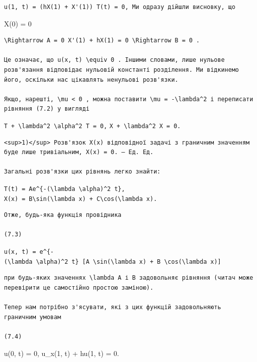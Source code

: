 \documentclass[
  ukrainian,
]{article}
\begin{document}
\begin{verbatim}
u(1, t) = (hX(1) + X'(1)) T(t) = 0, Ми одразу дійшли висновку, що
\end{verbatim}

X(0) = 0

\begin{verbatim}
\Rightarrow A = 0 X'(1) + hX(1) = 0 \Rightarrow B = 0 .

Це означає, що u(x, t) \equiv 0 . Іншими словами, лише нульове розв'язання відповідає нульовій константі розділення. Ми відкинемо його, оскільки нас цікавлять ненульові розв'язки.

Якщо, нарешті, \mu < 0 , можна поставити \mu = -\lambda^2 і переписати рівняння (7.2) у вигляді
\end{verbatim}

\texttt{T\textquotesingle{}\ +\ \textbackslash{}lambda\^{}2\ \textbackslash{}alpha\^{}2\ T\ =\ 0,}
\texttt{X\textquotesingle{}\ +\ \textbackslash{}lambda\^{}2\ X\ =\ 0.}

\begin{verbatim}
<sup>1)</sup> Розв'язок X(x) відповідної задачі з граничним значенням буде лише тривіальним, X(x) = 0. — Ед. Ед.

Загальні розв'язки цих рівнянь легко знайти:
\end{verbatim}

\texttt{T(t)\ =\ Ae\^{}\{-(\textbackslash{}lambda\ \textbackslash{}alpha)\^{}2\ t\},}
\texttt{X(x)\ =\ B\textbackslash{}sin(\textbackslash{}lambda\ x)\ +\ C\textbackslash{}cos(\textbackslash{}lambda\ x).}

\begin{verbatim}
Отже, будь-яка функція провідника

(7.3)
\end{verbatim}

\texttt{u(x,\ t)\ =\ e\^{}\{-(\textbackslash{}lambda\ \textbackslash{}alpha)\^{}2\ t\}\ {[}A\ \textbackslash{}sin(\textbackslash{}lambda\ x)\ +\ B\ \textbackslash{}cos(\textbackslash{}lambda\ x){]}}

\begin{verbatim}
при будь-яких значеннях \lambda A і B задовольняє рівняння (читач може перевірити це самостійно простою заміною).

Тепер нам потрібно з'ясувати, які з цих функцій задовольняють граничним умовам

(7.4)
\end{verbatim}

u(0, t) = 0, u\_x(1, t) + hu(1, t) = 0.
\end{document}
